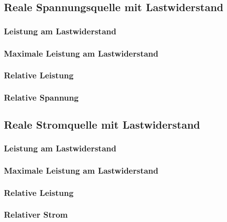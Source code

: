 \subsection{Reale Spannungsquelle mit Lastwiderstand}
\label{sec:real-tension-source}


\subsubsection{Leistung am Lastwiderstand}
\label{sec:real-tension-source-power}


\subsubsection{Maximale Leistung am Lastwiderstand}
\label{sec:real-tension-source-power-max}


\subsubsection{Relative Leistung}
\label{sec:real-tension-source-relative-power}


\subsubsection{Relative Spannung}
\label{sec:real-tension-source-relative-tension}


\subsection{Reale Stromquelle mit Lastwiderstand}
\label{sec:real-current-source}


\subsubsection{Leistung am Lastwiderstand}
\label{sec:real-current-source-power}


\subsubsection{Maximale Leistung am Lastwiderstand}
\label{sec:real-current-source-power-max}


\subsubsection{Relative Leistung}
\label{sec:real-current-source-relative-power}


\subsubsection{Relativer Strom}
\label{sec:real-current-source-relative-current}

